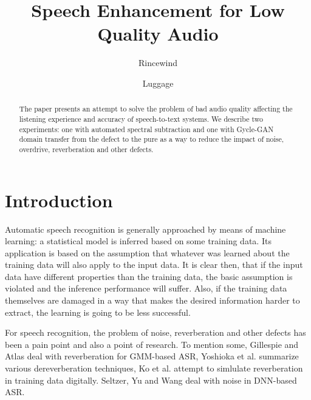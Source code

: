 \documentclass[runningheads]{llncs}
\begin{document}
%
\title{Speech Enhancement for Low Quality Audio}
%
%
\author{Rincewind
\and Luggage}
%
%
%
\maketitle              %
%
\begin{abstract}
The paper presents an attempt to solve the problem of bad audio quality
affecting the listening experience and accuracy of speech-to-text systems. We
describe two experiments: one with automated spectral subtraction and one
with Gycle-GAN domain transfer from the defect to the
pure as a way to reduce the impact of noise, overdrive, reverberation and other
defects.
\end{abstract}

\section{Introduction}

Automatic speech recognition is generally approached by means of machine
learning: a statistical model is inferred based on some training data. Its
application is based on the assumption that whatever was learned about the training
data will also apply to the input data. It is clear then, that if the input
data have different properties than the training data, the basic assumption is
violated and the inference performance will suffer.
Also, if the training data themselves are damaged in a way that makes the desired
information harder to extract, the learning is going to be less successful.

For speech recognition, the problem of noise, reverberation and other defects
has been a pain point and also a point of research. To mention some, Gillespie
and Atlas\cite{gillespie2002diversity} deal with reverberation for
GMM-based ASR, Yoshioka et al.\cite{reverbmagazine} summarize various
dereverberation techniques, Ko et al.\cite{reverbaugment} attempt to
simlulate reverberation in training data digitally. Seltzer, Yu and
Wang\cite{dnnnoiserobust} deal with noise in DNN-based ASR.
\end{document}
